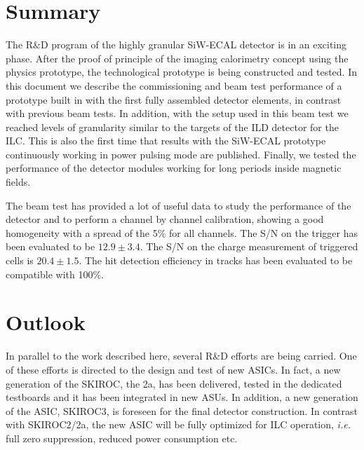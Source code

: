 \documentclass[a4paper,11pt]{article}
\begin{document}
\section{Summary}
\label{sec:summary}

The R\&D program of the highly granular SiW-ECAL detector is in an exciting phase. 
After the proof of principle of the imaging calorimetry concept using the physics prototype, the 
technological prototype is being constructed and tested. In this document we describe the commissioning and
beam test performance of a prototype built in with the first fully assembled
detector elements, in contrast with previous beam tests. In addition,
with the setup used in this beam test we reached levels of granularity
similar to the targets of the ILD detector for the ILC. This is also the first time
that results with the SiW-ECAL prototype continuously working in power pulsing mode are published.
Finally, we tested the performance of the detector
modules working for long periods inside magnetic fields.

The beam test has provided a lot of useful data to study 
the performance of the detector and to perform
a channel by channel calibration, showing a good homogeneity with a spread of the 5\% for all channels.
The S/N on the trigger has been evaluated to be $12.9\pm3.4$.
The S/N on the charge measurement of triggered cells is $20.4\pm1.5$. The hit detection efficiency
in tracks has been evaluated to be compatible with 100\%.

\section{Outlook}
\label{sec:outlook}

In parallel to the work described here, several R\&D efforts are being carried.
One of these efforts is directed to the design and test of new ASICs.
In fact, a new generation of the SKIROC, the 2a, has been delivered, tested in the dedicated testboards
and it has been integrated in new ASUs.
In addition, a new generation of the ASIC, SKIROC3, is foreseen for the final detector construction.
In contrast with SKIROC2/2a, the new ASIC will be fully optimized for ILC operation, {\it i.e.} full zero suppression, reduced power consumption etc.
\end{document}
